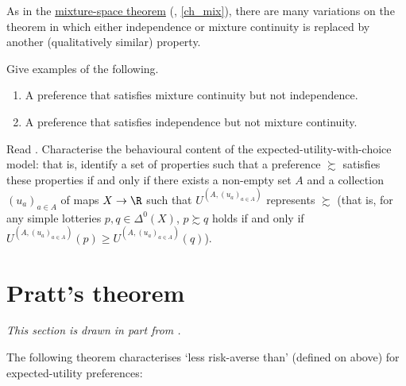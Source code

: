 As in the \hyperref[theorem:mix]{mixture-space theorem} (, \cref{ch_mix}), there are many variations on the theorem in which either independence or mixture continuity is replaced by another (qualitatively similar) property.

\begin{exercise}
	\label{exercise:vNM_indp}
	Give examples of the following.

	\begin{enumerate}[label=(\alph*)]
	
		\item A preference that satisfies mixture continuity but not independence.

		\item A preference that satisfies independence but not mixture continuity.
	
	\end{enumerate}
\end{exercise}

\begin{namedthm}
	\label{exercise:eu_choice_axioms}
	Read \textcite{CerreiavioglioDillenbergerOrtoleva2015}. Characterise the behavioural content of the expected-utility-with-choice model: that is, identify a set of properties such that a preference $\succsim$ satisfies these properties if and only if there exists a non-empty set $A$ and a collection $(u_a)_{a \in A}$ of maps $X \to \R$ such that $U^{(A,(u_a)_{a \in A})}$ represents $\succsim$ (that is, for any simple lotteries $p,q \in \Delta^0(X)$, $p \succsim q$ holds if and only if $U^{(A,(u_a)_{a \in A})}(p) \geq U^{(A,(u_a)_{a \in A})}(q)$).
\end{namedthm}



\section{Pratt's theorem}
\label{risk:pratt}

\emph{This section is drawn in part from \parencite{oo}.}

The following theorem characterises `less risk-averse than' (defined on  above) for expected-utility preferences:

